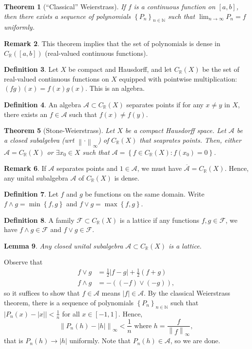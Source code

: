 \documentclass[11pt]{article}
\newtheorem{thm}{Theorem}[subsection]
\newtheorem{lemma}[thm]{Lemma}
\theoremstyle{definition}
\newtheorem{defn}[thm]{Definition}
\newtheorem{remark}[thm]{Remark}
\newcommand{\set}[1]{\left\{ #1 \right\}}
\newcommand{\abs}[1]{\left\lvert#1\right\rvert} %
\newcommand{\RR}{\mathbb{R}}
\newcommand{\NN}{\mathbb{N}}
\newcommand{\m}[1]{\mathcal{#1}}
\newcommand{\norm}[1]{\left\lVert#1\right\rVert} %
\begin{document}
\begin{thm}[``Classical'' Weierstrass]
If $f$ is a continuous function on $[a,b]$, then there exists a sequence of polynomials
$\set{P_n}_{n\in\NN}$ such that $\lim_{n\to\infty}P_n=f$ uniformly.
\end{thm}

\begin{remark}
This theorem implies that the set of polynomials is dense in $C_\RR([a,b])$ (real-valued
continuous functions).
\end{remark}

\begin{defn}
Let $X$ be compact and Hausdorff, and let $C_\RR(X)$ be the set of real-valued continuous
functions on $X$ equipped with pointwise multiplication: $(fg)(x)=f(x)g(x)$. This is an
algebra.
\end{defn}

\begin{defn}
An algebra $\m{A}\subset C_\RR(X)$ separates points if for any $x\neq y$ in $X$, there
exists an $f\in\m{A}$ such that $f(x)\neq f(y)$.
\end{defn}

\begin{thm}[Stone-Weierstrass]
Let $X$ be a compact Hausdorff space. Let $\m{A}$ be a closed subalgebra (wrt
$\norm{\cdot}_\infty$) of $C_\RR(X)$ that seaprates points. Then, either $\m{A}=C_\RR(X)$
or $\exists x_0\in X$ such that $\m{A}=\set{f\in C_\RR(X):f(x_0)=0}$.
\end{thm}

\begin{remark}
If $\m{A}$ separates points and $1\in\m{A}$, we must have $\overline{\m{A}}=C_\RR(X)$.
Hence, any unital subalgebra $\m{A}$ of $C_\RR(X)$ is dense.
\end{remark}

\begin{defn}
Let $f$ and $g$ be functions on the same domain. Write $f\wedge g=\min\set{f,g}$ and $f\vee
g=\max\set{f,g}$.
\end{defn}

\begin{defn}
A family $\m{F}\subset C_\RR(X)$ is a lattice if any functions $f,g\in\m{F}$, we have
$f\wedge g\in\m{F}$ and $f\vee g\in\m{F}$.
\end{defn}

\begin{lemma}
Any closed unital subalgebra $\m{A}\subset C_\RR(X)$ is a lattice.
\end{lemma}
\proof
Observe that
\begin{align*}
  f\vee g &= \frac12\abs{f-g} + \frac12(f+g) \\
  f\wedge g &= -((-f)\vee(-g)) ,
\end{align*}
so it suffices to show that $f\in\m{A}$ means $\abs{f}\in\m{A}$. By the classical
Weierstrass theorem, there is a sequence of polynomials $\set{P_n}_{n\in\NN}$ such that
$\abs{P_n(x)-\abs{x}}<\frac1n$ for all $x\in[-1,1]$. Hence,
\[
\norm{P_n(h)-\abs{h}}_\infty<\frac1n \text{ where } h=\frac{f}{\norm{f}_\infty} ,
\]
that is $P_n(h)\to\abs{h}$ uniformly. Note that $P_n(h)\in\m{A}$, so we are done.
\qedhere
\end{document}
